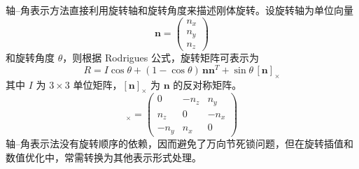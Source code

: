 轴–角表示方法直接利用旋转轴和旋转角度来描述刚体旋转。设旋转轴为单位向量 
\begin{equation}
\mathbf{n} = \begin{pmatrix} n_x \\ n_y \\ n_z \end{pmatrix}
\end{equation}
和旋转角度 $\theta$，则根据 Rodrigues 公式，旋转矩阵可表示为
\begin{equation}
	R = I \cos\theta + (1-\cos\theta)\, \mathbf{n}\mathbf{n}^T + \sin\theta \, [\mathbf{n}]_\times
\end{equation}
其中 $I$ 为 $3\times 3$ 单位矩阵，$[\mathbf{n}]_\times$ 为 $\mathbf{n}$ 的反对称矩阵。
\begin{equation}
	[\mathbf{n}]_\times = \begin{pmatrix}
		0 & -n_z & n_y \\
		n_z & 0 & -n_x \\
		-n_y & n_x & 0
	\end{pmatrix}
\end{equation}
轴–角表示法没有旋转顺序的依赖，因而避免了万向节死锁问题，但在旋转插值和数值优化中，常需转换为其他表示形式处理。



